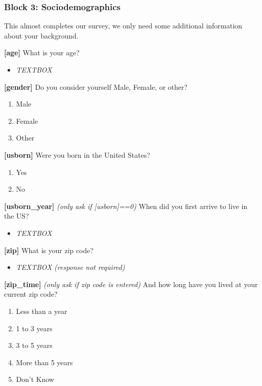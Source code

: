 \documentclass[
]{article}
\providecommand{\tightlist}{%
  \setlength{\itemsep}{0pt}\setlength{\parskip}{0pt}}
\begin{document}
\hypertarget{block-3-sociodemographics}{%
\subsubsection{Block 3:
Sociodemographics}\label{block-3-sociodemographics}}

This almost completes our survey, we only need some additional
information about your background.

\textbf{{[}age{]}} What is your age?

\begin{itemize}
\tightlist
\item
  \emph{TEXTBOX}
\end{itemize}

\textbf{{[}gender{]}} Do you consider yourself Male, Female, or other?

\begin{enumerate}
\def\labelenumi{\arabic{enumi}.}
\tightlist
\item
  Male
\item
  Female
\item
  Other
\end{enumerate}

\textbf{{[}usborn{]}} Were you born in the United States?

\begin{enumerate}
\def\labelenumi{\arabic{enumi}.}
\tightlist
\item
  Yes
\item
  No
\end{enumerate}

\textbf{{[}usborn\_year{]}} \emph{(only ask if {[}usborn{]}==0)} When
did you first arrive to live in the US?

\begin{itemize}
\tightlist
\item
  \emph{TEXTBOX}
\end{itemize}

\textbf{{[}zip{]}} What is your zip code?

\begin{itemize}
\tightlist
\item
  \emph{TEXTBOX} \emph{(response not required)}
\end{itemize}

\textbf{{[}zip\_time{]}} \emph{(only ask if zip code is entered)} And
how long have you lived at your current zip code?

\begin{enumerate}
\def\labelenumi{\arabic{enumi}.}
\tightlist
\item
  Less than a year
\item
  1 to 3 years
\item
  3 to 5 years
\item
  More than 5 years
\item
  Don't Know
\end{enumerate}
\end{document}
